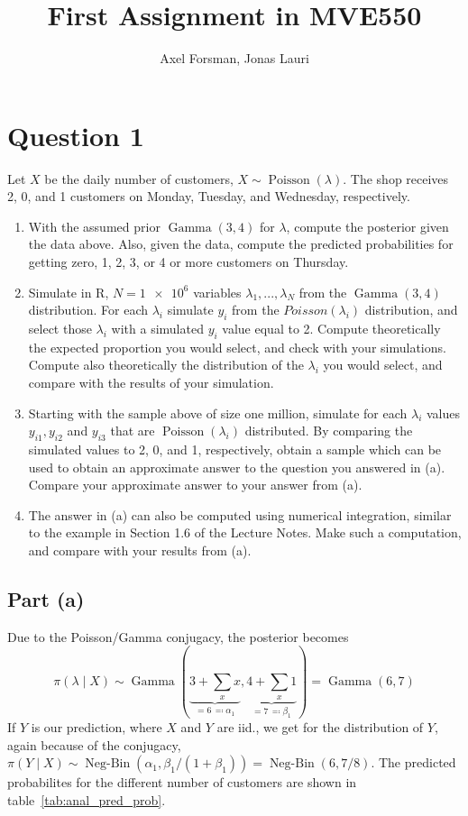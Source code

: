 \documentclass{article}
\title{First Assignment in MVE550}
\author{Axel Forsman, Jonas Lauri}
\DeclareMathOperator\Poisson{Poisson}
\DeclareMathOperator\GammaDist{Gamma}
\DeclareMathOperator\NegBin{Neg-Bin}
\begin{document}
\maketitle

\section{Question 1}
Let $X$ be the daily number of customers, $X \sim \Poisson(\lambda)$.
The shop receives 2, 0, and 1 customers on Monday, Tuesday, and Wednesday,
respectively.
\begin{enumerate}[label=(\alph*)]
	\item With the assumed prior $\GammaDist(3, 4)$ for $\lambda$,
		compute the posterior given the data above.
        Also, given the data, compute the predicted probabilities for getting zero, 1, 2, 3, or
        4 or more customers on Thursday.
    \item Simulate in R, $N = \num{1e6}$ variables $\lambda_1, ..., \lambda_N$ from the $\GammaDist(3, 4)$
        distribution. For each $\lambda_i$ simulate $y_i$ from the $Poisson(\lambda_i)$ distribution,
        and select those $\lambda_i$ with a simulated $y_i$ value equal to 2.
        Compute theoretically the expected proportion you would select, and
        check with your simulations. Compute also theoretically the distribution
        of the $\lambda_i$ you would select, and compare with the results of
        your simulation.
    \item Starting with the sample above of size one million, simulate for each
        $\lambda_i$ values $y_{i1}, y_{i2}$ and $y_{i3}$ that are $\Poisson(\lambda_i)$ distributed. 
        By comparing the simulated values to 2, 0, and 1, respectively, obtain a
        sample which can be used to obtain an approximate answer to the
        question you answered in (a). Compare your approximate answer to
        your answer from (a).
    \item The answer in (a) can also be computed using numerical integration,
        similar to the example in Section 1.6 of the Lecture Notes. Make
        such a computation, and compare with your results from (a).
\end{enumerate}

\subsection{Part (a)}
Due to the Poisson/Gamma conjugacy, the posterior becomes
\begin{equation*}
    \pi(\lambda \mid X) \sim \GammaDist(\underbrace{3 + \sum_x x}_{=6 \, \eqqcolon \alpha_1},
		\underbrace{4 + \sum_x 1}_{=7 \, \eqqcolon \beta_1}) = \GammaDist(6, 7)
\end{equation*}
If $Y$ is our prediction, where $X$ and $Y$ are iid.,
we get for the distribution of $Y$, again because of the conjugacy,
$\pi(Y \mid X) \sim \NegBin(\alpha_1, \beta_1 / (1 + \beta_1)) = \NegBin(6, 7/8)$.
The predicted probabilites for the different number of customers
are shown in table~\ref{tab:anal_pred_prob}.
\end{document}
